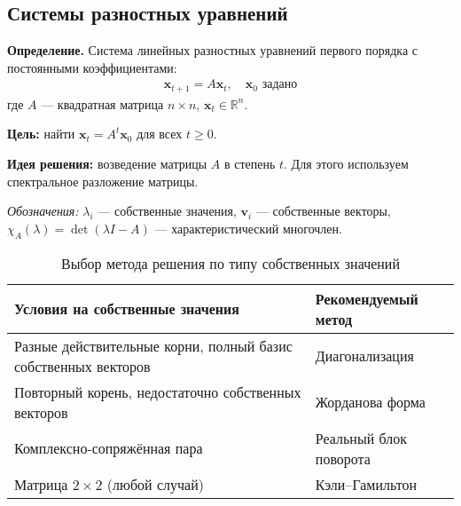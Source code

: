 \subsection{Системы разностных уравнений}\label{subsec:systems}

\begin{center}
\end{center}

\textbf{Определение.} Система линейных разностных уравнений первого порядка с постоянными коэффициентами:
\begin{align}
\mathbf{x}_{t+1} = A\mathbf{x}_t, \quad \mathbf{x}_0 \text{ задано}
\end{align}
где $A$ — квадратная матрица $n \times n$, $\mathbf{x}_t \in \mathbb{R}^n$.

\textbf{Цель:} найти $\mathbf{x}_t = A^t\mathbf{x}_0$ для всех $t \geq 0$.

\textbf{Идея решения:} возведение матрицы $A$ в степень $t$. Для этого используем спектральное разложение матрицы.

\textit{Обозначения:} $\lambda_i$ — собственные значения, $\mathbf{v}_i$ — собственные векторы, $\chi_A(\lambda) = \det(\lambda I - A)$ — характеристический многочлен.

\begin{table}[h!]
\centering
\caption{Выбор метода решения по типу собственных значений}
\label{tab:method-selection}
\begin{tabular}{|l|l|}
\hline
\textbf{Условия на собственные значения} & \textbf{Рекомендуемый метод} \\
\hline
Разные действительные корни, полный базис собственных векторов & Диагонализация \\
\hline
Повторный корень, недостаточно собственных векторов & Жорданова форма \\
\hline
Комплексно-сопряжённая пара & Реальный блок поворота \\
\hline
Матрица $2 \times 2$ (любой случай) & Кэли–Гамильтон \\
\hline
\end{tabular}
\end{table}

